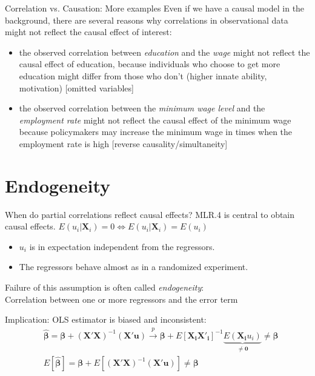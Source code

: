 \documentclass[11pt, aspectratio = 169]{beamer}
\begin{document}
\begin{frame}{Correlation vs. Causation: More examples}
Even if we have a causal model in the background, there are several reasons why correlations in observational data might not reflect the causal effect of interest:
\begin{itemize}
    \item the observed correlation between  \alert{\textit{education}} and the \alert{\textit{wage}} might not reflect the causal effect of education, because individuals who choose to get more education might differ from those who don't (higher innate ability, motivation) \alert{[omitted variables]}
    \item the observed correlation between the \alert{\textit{minimum wage level}} and the \alert{\textit{employment rate}} might not reflect the causal effect of the minimum wage because policymakers may increase the minimum wage in times when the employment rate is high \alert{[reverse causality/simultaneity]}
\end{itemize}
\end{frame}

\section{Endogeneity}

\begin{frame}{When do partial  correlations reflect causal effects?}
MLR.4 is central to obtain causal effects.
$E(u_i|\boldsymbol{X}_i) = 0 \Leftrightarrow E(u_i | \boldsymbol{X}_i) = E(u_i)$
\begin{itemize}
    \item $u_i$ is in expectation independent from the regressors. \\
    \item The regressors behave almost as in a randomized experiment. 
\end{itemize}
\bigskip
Failure of this assumption is often called \alert{\textit{endogeneity}}: \\
Correlation between one or more regressors and the error term

\bigskip
Implication: OLS estimator is biased and inconsistent: 
\begin{align*}
& \hat{\boldsymbol{\beta}} = \boldsymbol{\beta} + (\boldsymbol{X'}\boldsymbol{X})^{-1}(\boldsymbol{X}'\boldsymbol{u})\xrightarrow{p} \boldsymbol{\beta} +  E[\mathbf{X_i}\mathbf{X'_i}]^{-1}  \underbrace{E(\mathbf{X_i}u_i)}_{\neq \boldsymbol{0}} \neq \boldsymbol{\beta} \\
& E[\hat{\boldsymbol{\beta} }] = \boldsymbol{\beta}  + E[(\boldsymbol{X}'\boldsymbol{X})^{-1}(\boldsymbol{X}'\boldsymbol{u})]  \neq \boldsymbol{\beta}  \\
\end{align*}
\end{frame}
\end{document}
